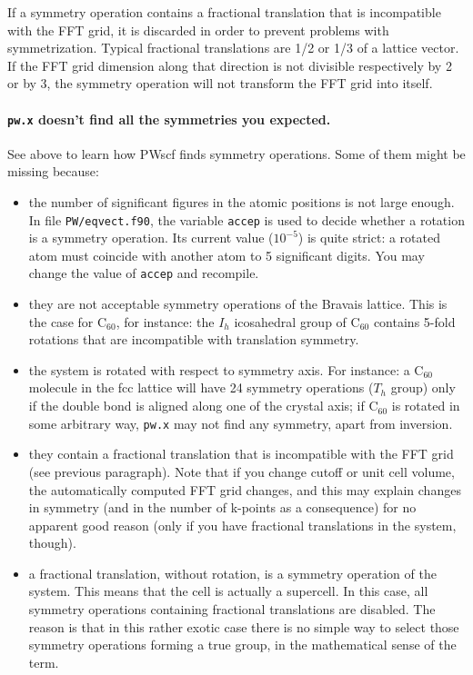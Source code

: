 \documentclass[12pt,a4paper]{article}
\begin{document}
If a symmetry operation contains a
fractional translation that is incompatible with the FFT grid,
it is discarded in order to prevent problems with symmetrization.
Typical fractional translations are 1/2 or 1/3 of a lattice
vector. If the FFT grid dimension along that direction is not 
divisible respectively by 2 or by 3, the symmetry operation will 
not transform the FFT grid into itself.

\paragraph{\texttt{pw.x} doesn't find all the symmetries you
           expected.}

See above to learn how PWscf finds symmetry operations.
Some of them might be missing because:
\begin{itemize}
  \item
    the number of significant figures in the atomic positions is not
    large enough.
    In file \texttt{PW/eqvect.f90}, the variable \texttt{accep} is
    used to decide whether a rotation is a symmetry operation.
    Its current value ($10^{-5}$) is quite strict: a rotated atom must
    coincide with another atom to 5 significant digits.
    You may change the value of \texttt{accep} and recompile.
  \item
    they are not acceptable symmetry operations of the Bravais
    lattice.
    This is the case for C$_{60}$, for instance: the $I_h$ icosahedral
    group of C$_{60}$ contains 5-fold rotations that are incompatible
    with translation symmetry.
  \item
    the system is rotated with respect to symmetry axis.
    For instance: a C$_{60}$ molecule in the fcc lattice will have 24
    symmetry operations ($T_h$ group) only if the double bond is
    aligned along one of the crystal axis; if C$_{60}$ is rotated in
    some arbitrary way, \texttt{pw.x} may not find any symmetry, apart
    from inversion.
  \item
    they contain a fractional translation that is incompatible with
    the FFT grid (see previous paragraph).
    Note that if you change cutoff or unit cell volume, the
    automatically computed FFT grid changes, and this may explain
    changes in symmetry (and in the number of k-points as a
    consequence) for no apparent good reason (only if you have
    fractional translations in the system, though).
  \item
    a fractional translation, without rotation, is a symmetry
    operation of the system. This means that the cell is actually 
    a supercell. In this case, all symmetry operations containing 
    fractional translations are disabled.
    The reason is that in this rather exotic case there is no simple
    way to select those symmetry operations forming a true group, in
    the mathematical sense of the term.
\end{itemize}
\end{document}
